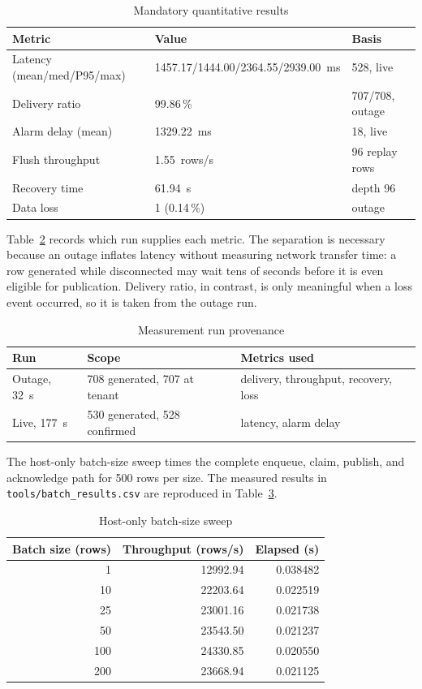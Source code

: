 \documentclass[conference]{IEEEtran}
\begin{document}
\begin{table}[t]
\caption{Mandatory quantitative results}
\label{tab:metrics}
\centering
\tiny
\begin{tabular}{@{}lll@{}}
\toprule
Metric & Value & Basis \\
\midrule
Latency (mean/med/P95/max) & 1457.17/1444.00/2364.55/2939.00~ms & 528, live \\
Delivery ratio & 99.86\,\% & 707/708, outage \\
Alarm delay (mean) & 1329.22~ms & 18, live \\
Flush throughput & 1.55~rows/s & 96 replay rows \\
Recovery time & 61.94~s & depth 96 \\
Data loss & 1 (0.14\,\%) & outage \\
\bottomrule
\end{tabular}
\end{table}

Table~\ref{tab:runs} records which run supplies each metric. The separation is
necessary because an outage inflates latency without measuring network transfer
time: a row generated while disconnected may wait tens of seconds before it is
even eligible for publication. Delivery ratio, in contrast, is only meaningful
when a loss event occurred, so it is taken from the outage run.

\begin{table}[t]
\caption{Measurement run provenance}
\label{tab:runs}
\centering
\scriptsize
\begin{tabular}{@{}lll@{}}
\toprule
Run & Scope & Metrics used \\
\midrule
Outage, 32~s & 708 generated, 707 at tenant & delivery, throughput, recovery, loss \\
Live, 177~s & 530 generated, 528 confirmed & latency, alarm delay \\
\bottomrule
\end{tabular}
\end{table}

The host-only batch-size sweep times the complete enqueue, claim, publish, and
acknowledge path for 500 rows per size. The measured results in
\texttt{tools/batch\_results.csv} are reproduced in Table~\ref{tab:batch}.

\begin{table}[t]
\caption{Host-only batch-size sweep}
\label{tab:batch}
\centering
\small
\begin{tabular}{@{}rrr@{}}
\toprule
Batch size (rows) & Throughput (rows/s) & Elapsed (s) \\
\midrule
1 & 12992.94 & 0.038482 \\
10 & 22203.64 & 0.022519 \\
25 & 23001.16 & 0.021738 \\
50 & 23543.50 & 0.021237 \\
100 & 24330.85 & 0.020550 \\
200 & 23668.94 & 0.021125 \\
\bottomrule
\end{tabular}
\end{table}
\end{document}
